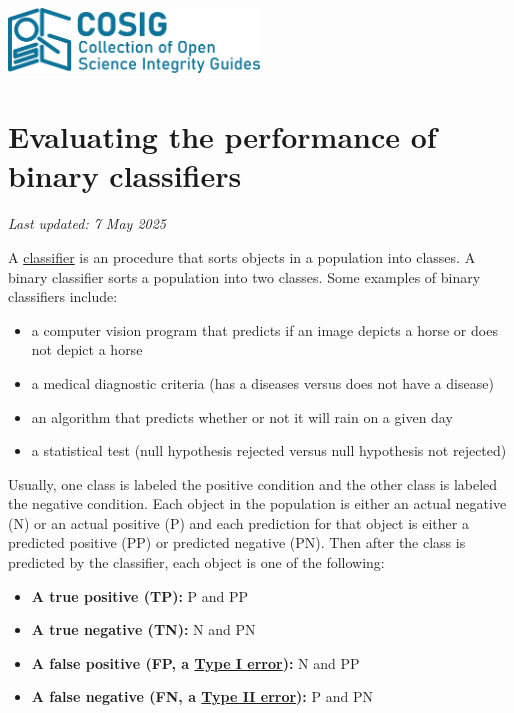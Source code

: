 \documentclass[letterpaper, 12pt]{article}
\begin{document}
\flushleft
\includegraphics[width=0.5\textwidth]{img/home/241017_final_logo_mockup.png}

\section*{Evaluating the performance of binary classifiers}
\textit{Last updated: 7 May 2025}

A \href{https://en.wikipedia.org/wiki/Classification_rule}{classifier} is an procedure that sorts objects in a population into classes. A binary classifier sorts a population into two classes. Some examples of binary classifiers include:

\begin{itemize}
    \setlength\itemsep{-0.5em}
    \item a computer vision program that predicts if an image depicts a horse or does not depict a horse
    \item a medical diagnostic criteria (has a diseases versus does not have a disease)
    \item an algorithm that predicts whether or not it will rain on a given day
    \item a statistical test (null hypothesis rejected versus null hypothesis not rejected)
\end{itemize}

Usually, one class is labeled the positive condition and the other class is labeled the negative condition. Each object in the population is either an actual negative (N) or an actual positive (P) and each prediction for that object is either a predicted positive (PP) or predicted negative (PN). Then after the class is predicted by the classifier, each object is one of the following:

\begin{itemize}
    \setlength\itemsep{-0.5em}
    \item \textbf{A true positive (TP):} P and PP
    \item \textbf{A true negative (TN):} N and PN
    \item \textbf{A false positive (FP, a \href{https://en.wikipedia.org/wiki/Type_I_and_type_II_errors}{Type I error}):} N and PP
    \item \textbf{A false negative (FN, a \href{https://en.wikipedia.org/wiki/Type_I_and_type_II_errors}{Type II error}):} P and PN
\end{itemize}
\end{document}
